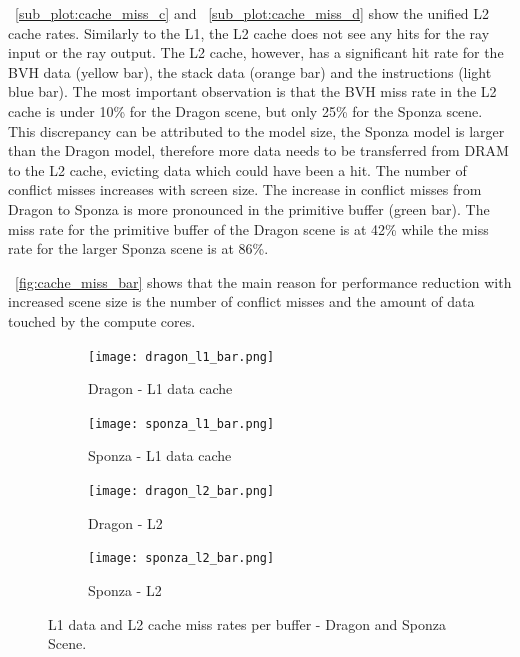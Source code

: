 ~\autoref{sub_plot:cache_miss_c} and ~\autoref{sub_plot:cache_miss_d} show the unified L2 cache rates. Similarly to the L1, the L2 cache does not see any hits for the ray input or the ray output. 
The L2 cache, however, has a significant hit rate for the BVH data (yellow bar), the stack data (orange bar) and the instructions (light blue bar).
The most important observation is that the BVH miss rate in the L2 cache is under 10\% for the Dragon scene, but only 25\% for the Sponza scene. This discrepancy can be attributed to the model size, the Sponza model is larger than the Dragon model, therefore more data needs to be transferred from DRAM to the L2 cache, evicting data which could have been a hit. The number of conflict misses increases with screen size.
The increase in conflict misses from Dragon to Sponza is more pronounced in the primitive buffer (green bar). The miss rate for the primitive buffer of the Dragon scene is at 42\% while the miss rate for the larger Sponza scene is at 86\%.

~\autoref{fig:cache_miss_bar} shows that the main reason for performance reduction with increased scene size is the number of conflict misses and the amount of data touched by the compute cores. 

\begin{figure}[htb]
  \begin{subfigure}{0.49\textwidth}
  \texttt{[image: dragon\_l1\_bar.png]}
  \caption{\label{sub_plot:cache_miss_a}Dragon - L1 data cache}
  \end{subfigure}
  \hspace*{\fill} %
  \begin{subfigure}{0.49\textwidth}
  \texttt{[image: sponza\_l1\_bar.png]}
  \caption{\label{sub_plot:cache_miss_b}Sponza - L1 data cache}
  \end{subfigure}
  \qquad
  \begin{subfigure}{0.49\textwidth}
  \texttt{[image: dragon\_l2\_bar.png]}
  \caption{\label{sub_plot:cache_miss_c}Dragon - L2}
  \end{subfigure}
  \hspace*{\fill} %
  \begin{subfigure}{0.49\textwidth}
  \texttt{[image: sponza\_l2\_bar.png]}
  \caption{\label{sub_plot:cache_miss_d}Sponza - L2}
  \end{subfigure}
  \caption{\label{fig:cache_miss_bar}
          L1 data and L2 cache miss rates per buffer - Dragon and Sponza Scene.
           }
\end{figure}


